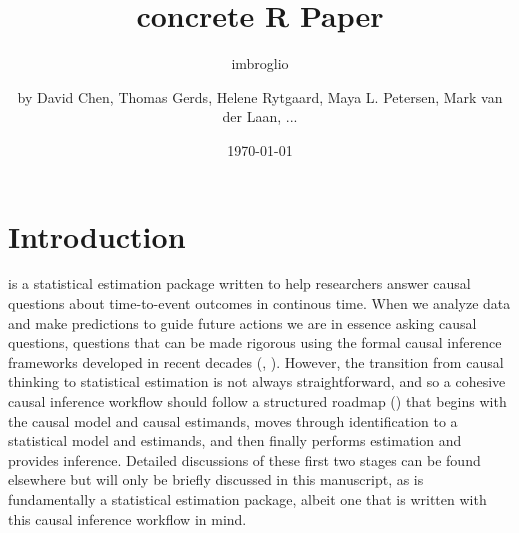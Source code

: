 \documentclass{report}
\author{imbroglio}
\date{\today}
\title{}
\newcommand{\1}{\ensuremath{\mathbf{1}}}
\begin{document}
\title{concrete R Paper}
\subtitle{}
\author{by David Chen, Thomas Gerds, Helene Rytgaard, Maya L. Petersen, Mark van der Laan, ...}

\maketitle


\section{Introduction}
\label{intro}
 is a statistical estimation package written to help researchers answer causal questions about time-to-event outcomes in continous time. When we analyze data and make predictions to guide future actions we are in essence asking causal questions, questions that can be made rigorous using the formal causal inference frameworks developed in recent decades (\cite{pearl_causal_2016}, \cite{holland_statistics_1986}). However, the transition from causal thinking to statistical estimation is not always straightforward, and so a cohesive causal inference workflow should follow a structured roadmap (\cite{petersen_causal_2014}) that begins with the causal model and causal estimands, moves through identification to a statistical model and estimands, and then finally performs estimation and provides inference. Detailed discussions of these first two stages can be found elsewhere but will only be briefly discussed in this manuscript, as  is fundamentally a statistical estimation package, albeit one that is written with this causal inference workflow in mind.
\end{document}

